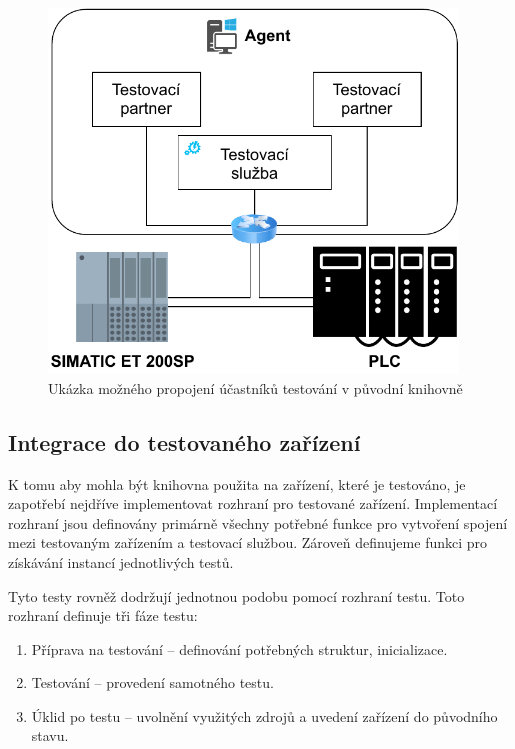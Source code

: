 \begin{figure}[htbp]
    \centering 
    \includegraphics[width=0.97\textwidth]{assets/img/bp_assets/devicemodel.pdf}
    \caption{Ukázka možného propojení účastníků testování v původní knihovně}
    \label{fig:bp_devicemodel}
\end{figure}


\subsection{Integrace do testovaného zařízení}

K tomu aby mohla být knihovna použita na zařízení, které je testováno, je zapotřebí nejdříve implementovat rozhraní pro testované zařízení. Implementací rozhraní jsou definovány primárně všechny potřebné funkce pro vytvoření spojení mezi testovaným zařízením a testovací službou. Zároveň definujeme funkci pro získávání instancí jednotlivých testů. 

Tyto testy rovněž dodržují jednotnou podobu pomocí rozhraní testu. Toto rozhraní definuje tři fáze testu:

\begin{enumerate}
    \item Příprava na testování -- definování potřebných struktur, inicializace.
    \item Testování -- provedení samotného testu.
    \item Úklid po testu -- uvolnění využitých zdrojů a uvedení zařízení do původního stavu.
\end{enumerate}


